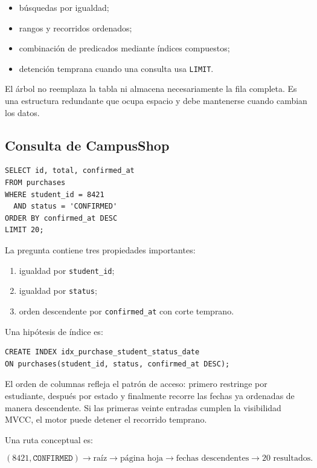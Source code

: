 \documentclass[variant=apuntes,cover=institutional,mode=screen]{ua-engineering-v6-article}
\begin{document}
\begin{itemize}
\item búsquedas por igualdad;
\item rangos y recorridos ordenados;
\item combinación de predicados mediante índices compuestos;
\item detención temprana cuando una consulta usa \texttt{LIMIT}.
\end{itemize}

El árbol no reemplaza la tabla ni almacena necesariamente la fila completa. Es una estructura redundante que ocupa espacio y debe mantenerse cuando cambian los datos.

\subsection{Consulta de CampusShop}

\begin{verbatim}
SELECT id, total, confirmed_at
FROM purchases
WHERE student_id = 8421
  AND status = 'CONFIRMED'
ORDER BY confirmed_at DESC
LIMIT 20;
\end{verbatim}

La pregunta contiene tres propiedades importantes:

\begin{enumerate}
\item igualdad por \texttt{student\_id};
\item igualdad por \texttt{status};
\item orden descendente por \texttt{confirmed\_at} con corte temprano.
\end{enumerate}

Una hipótesis de índice es:

\begin{verbatim}
CREATE INDEX idx_purchase_student_status_date
ON purchases(student_id, status, confirmed_at DESC);
\end{verbatim}

El orden de columnas refleja el patrón de acceso: primero restringe por estudiante, después por estado y finalmente recorre las fechas ya ordenadas de manera descendente. Si las primeras veinte entradas cumplen la visibilidad MVCC, el motor puede detener el recorrido temprano.

Una ruta conceptual es:

\[
(8421,\texttt{CONFIRMED})
\rightarrow
\text{raíz}
\rightarrow
\text{página hoja}
\rightarrow
\text{fechas descendentes}
\rightarrow
20\text{ resultados}.
\]
\end{document}
